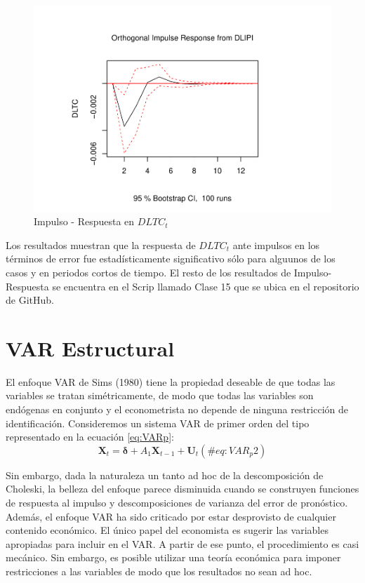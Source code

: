 \documentclass[
]{book}
\begin{document}
\begin{figure}

{\centering \includegraphics{Notas-Series-Tiempo_files/figure-latex/fig64-5} 

}

\caption{Impulso - Respuesta en $DLTC_t$}\label{fig:fig64-5}
\end{figure}

Los resultados muestran que la respuesta de \(DLTC_t\) ante impulsos en los términos de error fue estadísticamente significativo sólo para alguunos de los casos y en periodos cortos de tiempo. El resto de los resultados de Impulso-Respuesta se encuentra en el Scrip llamado Clase 15 que se ubica en el repositorio de GitHub.

\hypertarget{var-estructural}{%
\section{VAR Estructural}\label{var-estructural}}

El enfoque VAR de Sims (1980) tiene la propiedad deseable de que todas las variables se tratan simétricamente, de modo que todas las variables son endógenas en conjunto y el econometrista no depende de ninguna restricción de identificación. Consideremos un sistema VAR de primer orden del tipo representado en la ecuación \eqref{eq:VARp}:
\begin{equation}
    \mathbf{X}_t = \mathbf{\delta} + A_1 \mathbf{X}_{t-1} + \mathbf{U}_{t}
    (\#eq:VAR_p2)
\end{equation}

Sin embargo, dada la naturaleza un tanto ad hoc de la descomposición de Choleski, la belleza del enfoque parece disminuida cuando se construyen funciones de respuesta al impulso y descomposiciones de varianza del error de pronóstico. Además, el enfoque VAR ha sido criticado por estar desprovisto de cualquier contenido económico. El único papel del economista es sugerir las variables apropiadas para incluir en el VAR. A partir de ese punto, el procedimiento es casi mecánico. Sin embargo, es posible utilizar una teoría económica para imponer restricciones a las variables de modo que los resultados no sean ad hoc.
\end{document}
